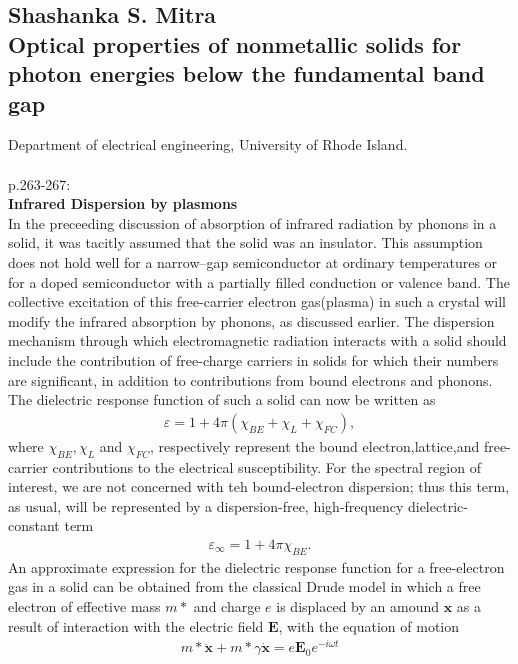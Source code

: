 \subsection{Shashanka S. Mitra \\
Optical properties of nonmetallic solids for photon energies below the fundamental band gap}
Department of electrical engineering, University of Rhode Island.
\\
\\
p.263-267:\\
\textbf{Infrared Dispersion by plasmons}\\
In the preceeding discussion of absorption of infrared radiation by phonons in a solid, it was tacitly
assumed that the solid was an insulator. This assumption does not hold well for a narrow--gap semiconductor at
ordinary temperatures or for a doped semiconductor with a partially filled conduction or valence band.
The collective excitation of this free-carrier electron gas(plasma) in such a crystal will modify the
infrared absorption by phonons, as discussed earlier. The dispersion mechanism through which electromagnetic
radiation interacts with a solid should include the contribution of free-charge carriers in solids for which
their numbers are significant, in addition to contributions from bound electrons and phonons.
The dielectric response function of such a solid can now be written as 
\begin{align}
   \varepsilon = 1 + 4\pi(\chi_{BE} + \chi_L + \chi_{FC}),
\end{align}
where $\chi_{BE}, \chi_L$ and $\chi_{FC}$, respectively represent the bound electron,lattice,and
free-carrier contributions to the electrical susceptibility. For the spectral region of interest, we
are not concerned with teh bound-electron dispersion; thus this term, as usual, will be 
represented by a dispersion-free, high-frequency dielectric-constant term
\begin{align}
   \varepsilon_{\infty} = 1 + 4\pi \chi_{BE}.
\end{align}
An approximate expression for the dielectric response function for a free-electron gas in a solid can be
obtained from the classical Drude model in which a free electron of effective mass $m*$ and charge $e$
is displaced by an amound $\boldsymbol x$ as a result of interaction with the electric field 
$\boldsymbol E$, with the equation of motion
\begin{align}
   m* \ddot{\boldsymbol x} + m* \gamma \dot{\boldsymbol x} = e \boldsymbol E_0 e^{-i\omega t}
\end{align}
